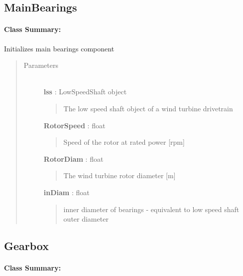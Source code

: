 \documentclass[letterpaper,10pt,openany,oneside]{sphinxmanual}
\begin{document}
\subsection{MainBearings}
\label{documentation:mainbearings}\label{documentation:mainbearings-class-label}\paragraph{Class Summary:}

\begin{fulllineitems}
\label{documentation:nacelleSE.src.nacelle_components.MainBearings}
Initializes main bearings component
\begin{quote}\begin{description}
\item[{Parameters }] \leavevmode\\
\textbf{lss} : LowSpeedShaft object
\begin{quote}

The low speed shaft object of a wind turbine drivetrain
\end{quote}

\textbf{RotorSpeed} : float
\begin{quote}

Speed of the rotor at rated power {[}rpm{]}
\end{quote}

\textbf{RotorDiam} : float
\begin{quote}

The wind turbine rotor diameter {[}m{]}
\end{quote}

\textbf{inDiam} : float
\begin{quote}

inner diameter of bearings - equivalent to low speed shaft outer diameter
\end{quote}

\end{description}\end{quote}

\end{fulllineitems}



\subsection{Gearbox}
\label{documentation:gearbox-class-label}\label{documentation:gearbox}\paragraph{Class Summary:}
\end{document}
